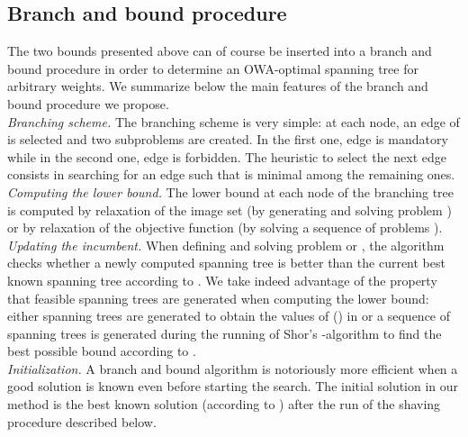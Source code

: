 \documentclass[final,3p,times]{elsarticle}
\begin{document}
\subsection{Branch and bound procedure}

The two bounds presented above can of course be inserted into a branch and bound procedure in order to determine an OWA-optimal spanning tree for arbitrary weights. We summarize below the main features of the branch and bound procedure we propose.\\ [1ex]
\emph{Branching scheme.} The branching scheme is very simple: at each node, an edge  of  is selected and two subproblems are created. In the first one, edge  is mandatory while in the second one, edge  is forbidden. The heuristic to select the next edge consists in searching for an edge  such that  is minimal among the remaining ones.\\ [1ex]
\emph{Computing the lower bound.} The lower bound at each node of the branching tree is computed by relaxation of the image set (by generating and solving problem ) or by relaxation of the objective function (by solving a sequence of problems ).\\ [1ex] \emph{Updating the incumbent.} When defining and solving problem
 or , the algorithm checks whether a newly
computed spanning tree is better than the current best known spanning
tree according to . We take indeed advantage of the property that feasible spanning trees are generated when computing the lower bound: either  spanning trees are generated to obtain the values of  () in 
or a sequence of spanning trees is generated during the running of
Shor's -algorithm to find the best possible bound according to
.\\ [1ex] 
\emph{Initialization.} A branch and bound algorithm is notoriously more efficient when a good solution is known even before starting the search. The initial solution in our method is the best known solution (according to ) after the run of the shaving procedure described below.
\end{document}
